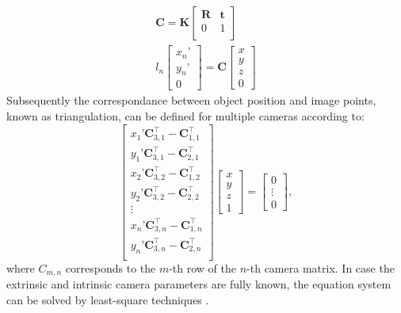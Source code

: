 \documentclass[5p,times,procedia]{elsarticle}
\begin{document}
%
\begin{align}
	\mathbf{C} = \mathbf{K}
	\begin{bmatrix}
		\mathbf{R} & \mathbf{t} \\
		0 & 1 \\
	\end{bmatrix} \\
	l_{n}
	\begin{bmatrix}
		x_n’ \\
		y_n’ \\
		0
	\end{bmatrix}
	= \mathbf{C}
	\begin{bmatrix}
		x \\
		y \\
		z \\
		0
	\end{bmatrix}
\end{align}
Subsequently the correspondance between object position and image points, known as triangulation, can be defined for multiple cameras according to:
%
\begin{equation}
	\label{eqn:triangulation}
	\begin{bmatrix}
		x_{1}’ \mathbf{C}_{3,1}^{\top} - \mathbf{C}_{1,1}^{\top}\\
		y_{1}’ \mathbf{C}_{3,1}^{\top} - \mathbf{C}_{2,1}^{\top}\\
		x_{2}’ \mathbf{C}_{3,2}^{\top} - \mathbf{C}_{1,2}^{\top}\\
		y_{2}’ \mathbf{C}_{3,2}^{\top} - \mathbf{C}_{2,2}^{\top}\\
		\vdots \\
		x_{n}’ \mathbf{C}_{3,n}^{\top} - \mathbf{C}_{1,n}^{\top}\\
		y_{n}’ \mathbf{C}_{3,n}^{\top} - \mathbf{C}_{2,n}^{\top}\\
	\end{bmatrix}
	\begin{bmatrix}
		x \\
		y \\
		z \\
		1
	\end{bmatrix}
	=
	\begin{bmatrix}
		0 \\
		\vdots \\
		0
	\end{bmatrix},
\end{equation}
%
where $C_{m,n}$ corresponds to the $m$-th row of the $n$-th camera matrix.
In case the extrinsic and intrinsic camera parameters are fully known, the equation system can be solved by least-square techniques \cite{Ahn2004}.
\end{document}
